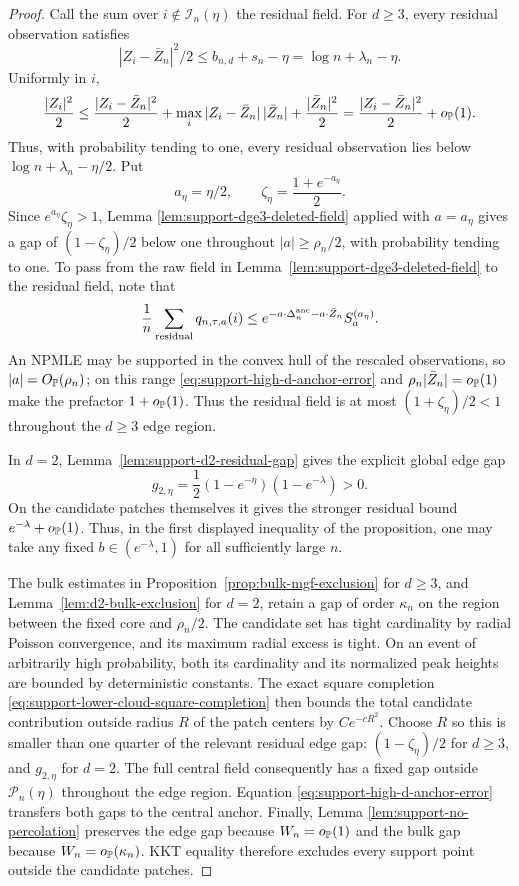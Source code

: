 \begin{proof}
Call the sum over \(i\notin\mathcal I_n(\eta)\) the residual field. For
\(d\ge3\), every residual
observation satisfies
\[
    |Z_i-\bar Z_n|^2/2\le b_{n,d}+s_n-\eta
       =\log n+\lambda_n-\eta.
\]
Uniformly in \(i\),
\[
 \frac{|Z_i|^2}{2}
 \le\frac{|Z_i-\bar Z_n|^2}{2}
    +\max_i|Z_i-\bar Z_n|\,|\bar Z_n|
    +\frac{|\bar Z_n|^2}{2}
 =\frac{|Z_i-\bar Z_n|^2}{2}+o_{\mathbb P}(1).
\]
Thus, with probability tending to one, every residual observation lies below
\(\log n+\lambda_n-\eta/2\). Put
\[
    a_\eta=\eta/2,
    \qquad
    \zeta_\eta=\frac{1+e^{-a_\eta}}2.
\]
Since \(e^{a_\eta}\zeta_\eta>1\), Lemma
\ref{lem:support-dge3-deleted-field} applied with \(a=a_\eta\) gives a gap of
\((1-\zeta_\eta)/2\) below one throughout
\(|a|\ge\rho_n/2\), with probability tending to one. To pass from the raw
field in Lemma~\ref{lem:support-dge3-deleted-field} to the residual field, note that
 \[
 \frac1n\sum_{\rm residual}q_{n,\tau,a}(i)
 \le e^{-a\cdot\Delta_n^{\rm anc}-a\cdot\bar Z_n}S_a^{(a_\eta)}.
 \]
An NPMLE may be supported in the convex hull of the rescaled observations, so
\(|a|=O_{\mathbb P}(\rho_n)\); on this range
\eqref{eq:support-high-d-anchor-error} and
\(\rho_n|\bar Z_n|=o_{\mathbb P}(1)\) make the prefactor \(1+o_{\mathbb P}(1)\).
Thus the residual field is at most
\((1+\zeta_\eta)/2<1\) throughout the \(d\ge3\) edge region.

In \(d=2\), Lemma~\ref{lem:support-d2-residual-gap} gives the explicit global
edge gap
\[
 g_{2,\eta}=\frac12(1-e^{-\eta})(1-e^{-\lambda})>0.
\]
On the candidate patches themselves it gives the stronger residual bound
\(e^{-\lambda}+o_{\mathbb P}(1)\). Thus, in the first displayed inequality of the
proposition, one may take any fixed \(b\in(e^{-\lambda},1)\) for all
sufficiently large \(n\).

The bulk estimates in Proposition~\ref{prop:bulk-mgf-exclusion} for
\(d\ge3\), and Lemma~\ref{lem:d2-bulk-exclusion} for \(d=2\), retain a gap
of order \(\kappa_n\) on the region between the fixed core and
\(\rho_n/2\). The candidate set has tight cardinality by radial Poisson
convergence, and its maximum radial excess is tight. On an event of arbitrarily
high probability, both its cardinality and its normalized peak heights are
bounded by deterministic constants. The exact square completion
\eqref{eq:support-lower-cloud-square-completion} then bounds the total
candidate contribution outside radius \(R\) of the patch centers by
\(Ce^{-cR^2}\). Choose \(R\) so this is smaller than one quarter of the
relevant residual edge gap: \((1-\zeta_\eta)/2\) for \(d\ge3\), and
\(g_{2,\eta}\) for \(d=2\). The full central field consequently has a fixed
gap outside \(\mathcal P_n(\eta)\) throughout the edge region. Equation
\eqref{eq:support-high-d-anchor-error} transfers both gaps to the central
anchor. Finally, Lemma
\ref{lem:support-no-percolation} preserves the edge gap because
\(W_n=o_{\mathbb P}(1)\) and the bulk gap because
\(W_n=o_{\mathbb P}(\kappa_n)\). KKT equality therefore excludes every
support point outside the candidate patches.


\end{proof}
